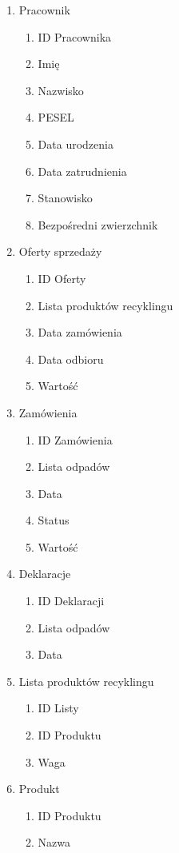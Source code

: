 \begin{enumerate}
		\item Pracownik
		\begin{enumerate}
			\item ID Pracownika
			\item Imię
			\item Nazwisko
			\item PESEL
			\item Data urodzenia
			\item Data zatrudnienia
			\item Stanowisko
			\item Bezpośredni zwierzchnik
		\end{enumerate}

		\item Oferty sprzedaży
		\begin{enumerate}
			\item ID Oferty
			\item Lista produktów recyklingu
			\item Data zamówienia
			\item Data odbioru
			\item Wartość
		\end{enumerate}

		\item Zamówienia
		\begin{enumerate}
			\item ID Zamówienia
			\item Lista odpadów
			\item Data
			\item Status
			\item Wartość
		\end{enumerate}

		\item Deklaracje
		\begin{enumerate}
			\item ID Deklaracji
			\item Lista odpadów
			\item Data
		\end{enumerate}

		\item Lista produktów recyklingu
		\begin{enumerate}
			\item ID Listy
			\item ID Produktu
			\item Waga
		\end{enumerate}

		\item Produkt
		\begin{enumerate}
			\item ID Produktu
			\item Nazwa
		\end{enumerate}


\end{enumerate}
